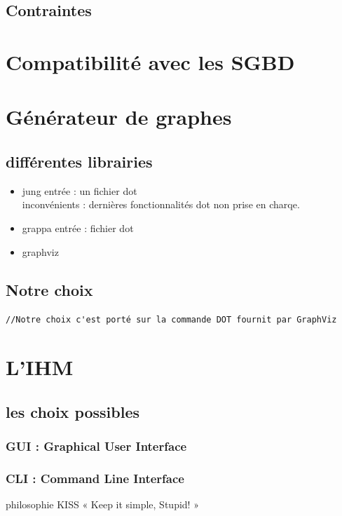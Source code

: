 	\subsection{Contraintes}

\section{Compatibilité avec les SGBD}

\section{Générateur de graphes}
  \subsection{différentes librairies}
		\begin{itemize}
			\item jung
				entrée : un fichier dot\\
				inconvénients : dernières fonctionnalités dot non prise en charqe.
			\item grappa
				 entrée : fichier dot
			\item graphviz
		\end{itemize}	
  \subsection{Notre choix}
		\verb+//Notre choix c'est porté sur la commande DOT fournit par GraphViz+


\section{L'IHM}	
	\subsection{les choix possibles}
			\subsubsection{GUI : \og Graphical User Interface \fg{}}
			\subsubsection{CLI : \og Command Line Interface \fg{}}
				philosophie KISS « Keep it simple, Stupid! »
